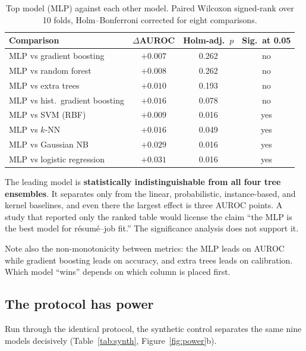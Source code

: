 \documentclass[11pt]{article}                      %
\newcommand{\tabfont}{\footnotesize}
\begin{document}
\begin{table}[t]
\centering\tabfont
\caption{Top model (MLP) against each other model. Paired Wilcoxon signed-rank
over 10 folds, Holm--Bonferroni corrected for eight comparisons.}
\label{tab:posthoc}
\begin{tabular}{lccc}
\toprule
Comparison & $\Delta$AUROC & Holm-adj.\ $p$ & Sig.\ at 0.05 \\
\midrule
MLP vs gradient boosting        & $+0.007$ & 0.262 & no \\
MLP vs random forest            & $+0.008$ & 0.262 & no \\
MLP vs extra trees              & $+0.010$ & 0.193 & no \\
MLP vs hist.\ gradient boosting & $+0.016$ & 0.078 & no \\
MLP vs SVM (RBF)                & $+0.009$ & 0.016 & yes \\
MLP vs $k$-NN                   & $+0.016$ & 0.049 & yes \\
MLP vs Gaussian NB              & $+0.029$ & 0.016 & yes \\
MLP vs logistic regression      & $+0.031$ & 0.016 & yes \\
\bottomrule
\end{tabular}
\end{table}

The leading model is \textbf{statistically indistinguishable from all four tree
ensembles}. It separates only from the linear, probabilistic, instance-based, and
kernel baselines, and even there the largest effect is three AUROC points. A
study that reported only the ranked table would license the claim ``the MLP is
the best model for résumé--job fit.'' The significance analysis does not support
it.

Note also the non-monotonicity between metrics: the MLP leads on AUROC while
gradient boosting leads on accuracy, and extra trees leads on calibration. Which
model ``wins'' depends on which column is placed first.

\subsection{The protocol has power}
\label{sec:power}

Run through the identical protocol, the synthetic control separates the same nine
models decisively (Table~\ref{tab:synth}, Figure~\ref{fig:power}b).
\end{document}
